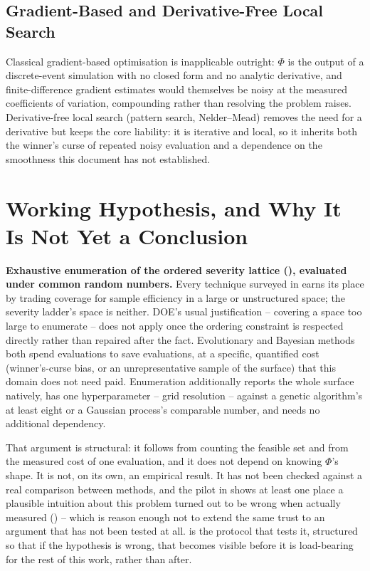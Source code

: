 \subsection{Gradient-Based and Derivative-Free Local Search}

Classical gradient-based optimisation is inapplicable outright: $\Phi$ is the
output of a discrete-event simulation with no closed form and no analytic
derivative, and finite-difference gradient estimates would themselves be noisy
at the measured coefficients of variation, compounding rather than resolving
the problem  raises. Derivative-free local search
(pattern search, Nelder--Mead) removes the need for a derivative but keeps the
core liability: it is iterative and local, so it inherits both the winner's
curse of repeated noisy evaluation and a dependence on the smoothness this
document has not established.

\section{Working Hypothesis, and Why It Is Not Yet a Conclusion}
\label{sec:hypothesis}

\textbf{Exhaustive enumeration of the ordered severity lattice
(), evaluated under common random numbers.} Every
technique surveyed in  earns its place by trading
coverage for sample efficiency in a large or unstructured space; the severity
ladder's space is neither. DOE's usual justification -- covering a space too
large to enumerate -- does not apply once the ordering constraint is
respected directly rather than repaired after the fact. Evolutionary and
Bayesian methods both spend evaluations to save evaluations, at a specific,
quantified cost (winner's-curse bias, or an unrepresentative sample of the
surface) that this domain does not need paid. Enumeration additionally
reports the whole surface natively, has one hyperparameter -- grid resolution
-- against a genetic algorithm's at least eight or a Gaussian process's
comparable number, and needs no additional dependency.

That argument is structural: it follows from counting the feasible set and
from the measured cost of one evaluation, and it does not depend on knowing
$\Phi$'s shape. It is not, on its own, an empirical result. It has not been
checked against a real comparison between methods, and the pilot in
 shows at least one place a plausible intuition about this
problem turned out to be wrong when actually measured
() -- which is reason enough not to extend the same trust to
an argument that has not been tested at all.  is the
protocol that tests it, structured so that if the hypothesis is wrong, that
becomes visible before it is load-bearing for the rest of this work, rather
than after.

